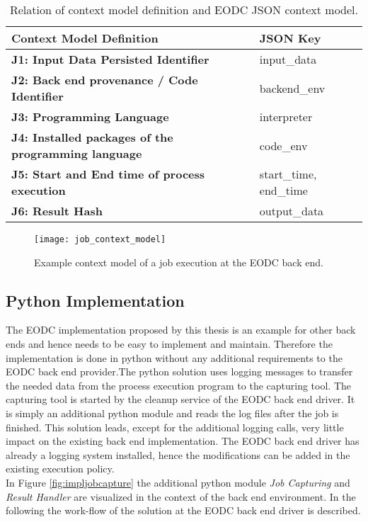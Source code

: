 \documentclass[draft,final]{vutinfth} %
\begin{document}
\begin{table}[]
	\caption{Relation of context model definition and EODC JSON context model.}
	\begin{tabular}{l|l}
		\textbf{Context Model Definition} & \textbf{JSON Key} \\ \hline
		\textbf{J1: Input Data Persisted Identifier} & input\_data \\ \hline
		\textbf{J2: Back end provenance / Code Identifier} & backend\_env \\ \hline
		\textbf{J3: Programming Language} & interpreter \\ \hline
		\textbf{J4: Installed packages of the programming language} & code\_env \\ \hline
		\textbf{J5: Start and End time of process execution} & start\_time, end\_time \\ \hline
		\textbf{J6: Result Hash} & output\_data \\ %
	\end{tabular}
\label{Tab:contextmodel}
\end{table}

\begin{figure}[h]
	\centering
	\texttt{[image: job\_context\_model]}
	\caption{Example context model of a job execution at the EODC back end.}
	\label{fig:job_context_model} %
\end{figure}

\subsection{Python Implementation}\label{Implementation:Python Implementation}
The EODC implementation proposed by this thesis is an example for other back ends and hence needs to be easy to implement and maintain. Therefore the implementation is done in python without any additional requirements to the EODC back end provider.The python solution uses logging messages to transfer the needed data from the process execution program to the capturing tool. The capturing tool is started by the cleanup service of the EODC back end driver. It is simply an additional python module and reads the log files after the job is finished. This solution leads, except for the additional logging calls, very little impact on the existing back end implementation. The EODC back end driver has already a logging system installed, hence the modifications can be added in the existing execution policy. \\
In Figure \ref{fig:impljobcapture} the additional python module \textit{Job Capturing} and \textit{Result Handler} are visualized in the context of the back end environment. In the following the work-flow of the solution at the EODC back end driver is described. 
\end{document}
